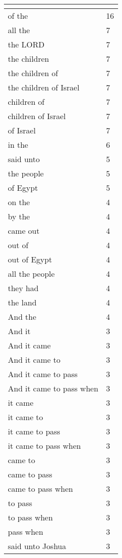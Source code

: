 \begin{center}
\begin{longtable}{|p{3.0in}|p{0.5in}|}
\hline \multicolumn{2}{c}{{ }} \\ \hline
\endfoot 
of the & 16\\ \hline 
all the & 7\\ \hline 
the LORD & 7\\ \hline 
the children & 7\\ \hline 
the children of & 7\\ \hline 
the children of Israel & 7\\ \hline 
children of & 7\\ \hline 
children of Israel & 7\\ \hline 
of Israel & 7\\ \hline 
in the & 6\\ \hline 
said unto & 5\\ \hline 
the people & 5\\ \hline 
of Egypt & 5\\ \hline 
on the & 4\\ \hline 
by the & 4\\ \hline 
came out & 4\\ \hline 
out of & 4\\ \hline 
out of Egypt & 4\\ \hline 
all the people & 4\\ \hline 
they had & 4\\ \hline 
the land & 4\\ \hline 
And the & 4\\ \hline 
And it & 3\\ \hline 
And it came & 3\\ \hline 
And it came to & 3\\ \hline 
And it came to pass & 3\\ \hline 
And it came to pass when & 3\\ \hline 
it came & 3\\ \hline 
it came to & 3\\ \hline 
it came to pass & 3\\ \hline 
it came to pass when & 3\\ \hline 
came to & 3\\ \hline 
came to pass & 3\\ \hline 
came to pass when & 3\\ \hline 
to pass & 3\\ \hline 
to pass when & 3\\ \hline 
pass when & 3\\ \hline 
said unto Joshua & 3\\ \hline 

\end{longtable}
\end{center}
